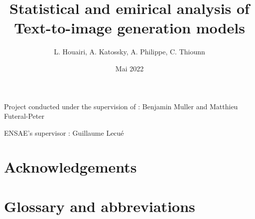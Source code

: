 \documentclass{article}
\title{Statistical and emirical analysis of Text-to-image generation models}
\author{L. Houairi,
A. Katossky,
A. Philippe,
C. Thiounn }
\date{Mai 2022}
\newcommand{\bm}[1]{{\color{blue}\textbf{BM}: #1}}
\newcommand{\mf}[1]{{\color{green}\textbf{MF}: #1}}
\begin{document}
\begin{titlepage}
\maketitle

Project conducted under the supervision of : Benjamin Muller and Matthieu Futeral-Peter 

ENSAE's supervisor : Guillaume Lecué
\end{titlepage}

\renewcommand*\contentsname{Table of Contents}
\tableofcontents

\pagebreak
{} %
\section*{Acknowledgements} 

\pagebreak
{}
{}
\section*{Glossary and abbreviations}
\end{document}
